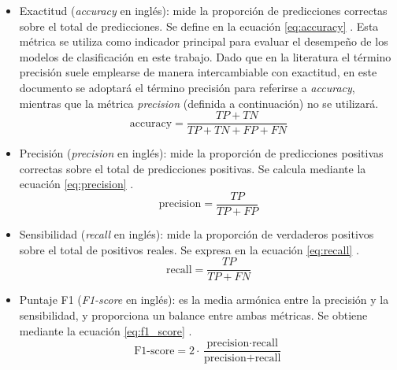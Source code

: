 \begin{itemize}
    \item Exactitud (\textit{accuracy} en inglés): mide la proporción de predicciones correctas sobre el total de predicciones. Se define en la ecuación \eqref{eq:accuracy} \cite{bishop2006pattern}. Esta métrica se utiliza como indicador principal para evaluar el desempeño de los modelos de clasificación en este trabajo. Dado que en la literatura el término precisión suele emplearse de manera intercambiable con exactitud, en este documento se adoptará el término precisión para referirse a \textit{accuracy}, mientras que la métrica \textit{precision} (definida a continuación) no se utilizará.
    \begin{equation}
        \label{eq:accuracy}
        \text{accuracy} = \frac{TP + TN}{TP + TN + FP + FN}
    \end{equation}
    \item Precisión (\textit{precision} en inglés): mide la proporción de predicciones positivas correctas sobre el total de predicciones positivas. Se calcula mediante la ecuación \eqref{eq:precision} \cite{bishop2006pattern}.
    \begin{equation}
        \label{eq:precision}
        \text{precision} = \frac{TP}{TP + FP}
    \end{equation}
    \item Sensibilidad (\textit{recall} en inglés): mide la proporción de verdaderos positivos sobre el total de positivos reales. Se expresa en la ecuación \eqref{eq:recall} \cite{bishop2006pattern}.
    \begin{equation}
        \label{eq:recall}
        \text{recall} = \frac{TP}{TP + FN}
    \end{equation}
    \item Puntaje F1 (\textit{F1-score} en inglés): es la media armónica entre la precisión y la sensibilidad, y proporciona un balance entre ambas métricas. Se obtiene mediante la ecuación \eqref{eq:f1_score} \cite{bishop2006pattern}.
    \begin{equation}
        \label{eq:f1_score}
        \text{F1-score} = 2 \cdot \frac{\text{precision} \cdot \text{recall}}{\text{precision} + \text{recall}}
    \end{equation}
\end{itemize}

